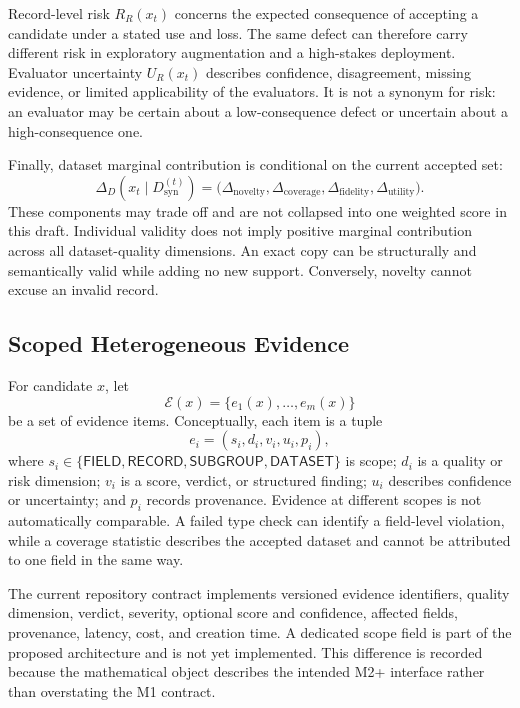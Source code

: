 Record-level risk $R_R(x_t)$ concerns the expected consequence of accepting a
candidate under a stated use and loss. The same defect can therefore carry
different risk in exploratory augmentation and a high-stakes deployment.
Evaluator uncertainty $U_R(x_t)$ describes confidence, disagreement, missing
evidence, or limited applicability of the evaluators. It is not a synonym for
risk: an evaluator may be certain about a low-consequence defect or uncertain
about a high-consequence one.

Finally, dataset marginal contribution is conditional on the current accepted
set:
\begin{equation}
  \Delta_D\!\left(x_t\mid D_{\mathrm{syn}}^{(t)}\right)
  =\bigl(\Delta_{\mathrm{novelty}},
         \Delta_{\mathrm{coverage}},
         \Delta_{\mathrm{fidelity}},
         \Delta_{\mathrm{utility}}\bigr).
  \label{eq:dataset-contribution}
\end{equation}
These components may trade off and are not collapsed into one weighted score
in this draft. Individual validity does not imply positive marginal
contribution across all dataset-quality dimensions. An exact copy can be
structurally and semantically valid while adding no new support. Conversely,
novelty cannot excuse an invalid record.

\subsection{Scoped Heterogeneous Evidence}

For candidate $x$, let
\begin{equation}
  \mathcal{E}(x)=\{e_1(x),\ldots,e_m(x)\}
  \label{eq:evidence-set}
\end{equation}
be a set of evidence items. Conceptually, each item is a tuple
\begin{equation}
  e_i=(s_i,d_i,v_i,u_i,p_i),
  \label{eq:evidence-item}
\end{equation}
where $s_i\in\{\mathsf{FIELD},\mathsf{RECORD},\mathsf{SUBGROUP},
\mathsf{DATASET}\}$ is scope; $d_i$ is a quality or risk dimension; $v_i$ is
a score, verdict, or structured finding; $u_i$ describes confidence or
uncertainty; and $p_i$ records provenance. Evidence at different scopes is not
automatically comparable. A failed type check can identify a field-level
violation, while a coverage statistic describes the accepted dataset and
cannot be attributed to one field in the same way.

The current repository contract implements versioned evidence identifiers,
quality dimension, verdict, severity, optional score and confidence, affected
fields, provenance, latency, cost, and creation time. A dedicated scope field
is part of the proposed architecture and is not yet implemented. This
difference is recorded because the mathematical object describes the intended
M2+ interface rather than overstating the M1 contract.

